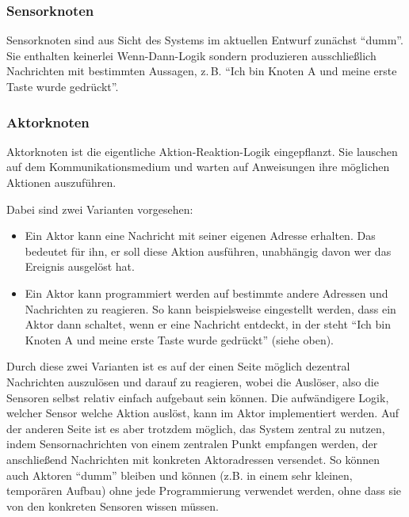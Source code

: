 \documentclass{IEEEtran}
\begin{document}
        \subsubsection{Sensorknoten}\label{Sensorknoten}
            Sensorknoten sind aus Sicht des Systems im aktuellen Entwurf
            zunächst \enquote{dumm}. Sie enthalten keinerlei Wenn-Dann-Logik
            sondern produzieren ausschließlich Nachrichten mit bestimmten
            Aussagen, z.\,B. \enquote{Ich bin Knoten A und meine erste Taste
            wurde gedrückt}.
        \subsubsection{Aktorknoten}\label{Aktorknoten}
            Aktorknoten ist die eigentliche Aktion-Reaktion-Logik eingepflanzt.
            Sie lauschen auf dem Kommunikationsmedium und warten auf Anweisungen
            ihre möglichen Aktionen auszuführen.

            Dabei sind zwei Varianten vorgesehen:
            \begin{itemize}
                \item Ein Aktor kann eine Nachricht mit seiner eigenen Adresse
                    erhalten. Das bedeutet für ihn, er soll diese Aktion
                    ausführen, unabhängig davon wer das Ereignis ausgelöst hat.
                \item Ein Aktor kann programmiert werden auf bestimmte andere
                    Adressen und Nachrichten zu reagieren.
                    So kann beispielsweise eingestellt werden, dass ein Aktor
                    dann schaltet, wenn er eine Nachricht entdeckt, in der steht
                    \enquote{Ich bin Knoten A und meine erste Taste
                    wurde gedrückt} (siehe oben).
            \end{itemize}

            Durch diese zwei Varianten ist es auf der einen Seite möglich
            dezentral Nachrichten auszulösen und darauf zu reagieren, wobei
            die Auslöser, also die Sensoren selbst relativ einfach aufgebaut
            sein können. Die aufwändigere Logik, welcher Sensor welche Aktion
            auslöst, kann im Aktor implementiert werden.
            Auf der anderen Seite ist es aber trotzdem möglich, das System
            zentral zu nutzen, indem Sensornachrichten von einem zentralen
            Punkt empfangen werden, der anschließend Nachrichten mit konkreten
            Aktoradressen versendet. So können auch Aktoren \enquote{dumm}
            bleiben und können (z.B. in einem sehr kleinen, temporären Aufbau)
            ohne jede Programmierung verwendet werden, ohne dass sie von den
            konkreten Sensoren wissen müssen.
\end{document}
